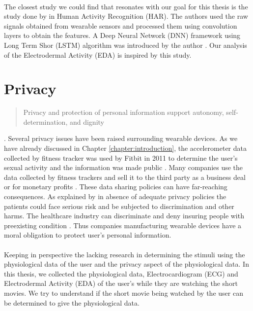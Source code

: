 \paragraph{} The closest study we could find that resonates with our goal for this thesis is the study done by \citeauthor{ordonez_deep_2016} in Human Activity Recognition (HAR). The authors used the raw signals obtained from wearable sensors and processed them using convolution layers to obtain the features. A Deep Neural Network (DNN) framework using Long Term Shor (LSTM) algorithm was introduced by the author \cite{ordonez_deep_2016}. Our analysis of the Electrodermal Activity (EDA) is inspired by this study. 

\section{Privacy} \blockquote{Privacy and protection of personal information support autonomy, self-determination, and dignity} \cite{hurley_taking_2014}. Several privacy issues have been raised surrounding wearable devices. As we have already discussed in Chapter \ref{chapter:introduction}, the accelerometer data collected by fitness tracker was used by Fitbit in 2011 to determine the user's sexual activity and the information was made public \cite{Fitbit}. Many companies use the data collected by fitness trackers and sell it to the third party as a business deal or for monetary profits \cite{ever_step_you_fake}. These data sharing policies can have far-reaching consequences. As explained by \citeauthor{montgomery_health_nodate} in absence of adequate privacy policies the patients could face serious risk and be subjected to discrimination and other harms. The healthcare industry can discriminate and deny insuring people with preexisting condition \cite{montgomery_health_nodate}. Thus companies manufacturing wearable devices have a moral obligation to protect user's personal information.

\paragraph{} Keeping in perspective the lacking research in determining the stimuli using the physiological data of the user and the privacy aspect of the physiological data. In this thesis, we collected the physiological data, Electrocardiogram (ECG) and Electrodermal Activity (EDA) of the user's while they are watching the short movies. We try to understand if the short movie being watched by the user can be determined to give the physiological data.


